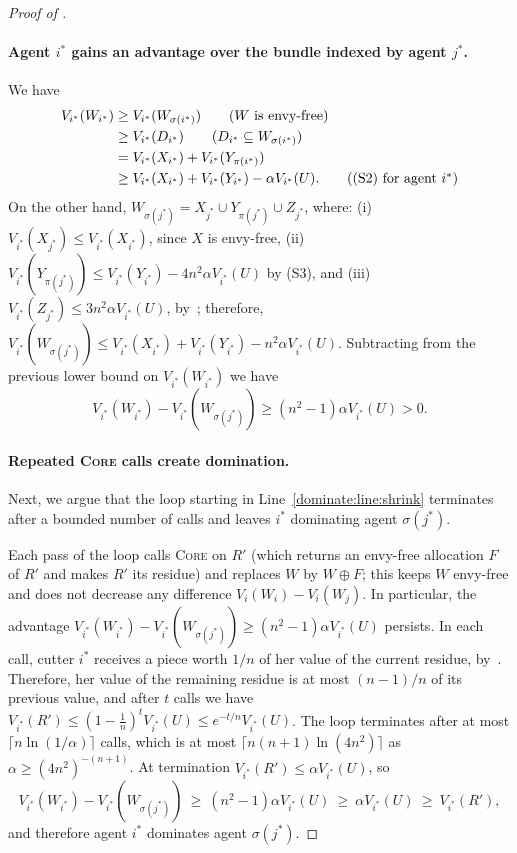 \documentclass[11pt]{article}
\newcommand{\Core}{\textsc{Core}}
\theoremstyle{plain}
\theoremstyle{definition}
\theoremstyle{plain}
\begin{document}
\begin{proof}[Proof of ]
\paragraph{Agent $i^*$ gains an advantage over the bundle indexed by agent $j^*$.}
We have
\begin{align*}
  V_{i^*}(W_{i^*}) &\ge V_{i^*}(W_{\sigma(i^*)}) \tag{$W$ is envy-free} \\ 
  &\ge V_{i^*}(D_{i^*}) \tag{$D_{i^*}\subseteq W_{\sigma(i^*)}$} \\ 
  &= V_{i^*}(X_{i^*})+V_{i^*}(Y_{\pi(i^*)}) \\ 
  &\ge V_{i^*}(X_{i^*})+V_{i^*}(Y_{i^*})-\alpha V_{i^*}(U). \tag{(S2) for agent $i^*$}  
\end{align*}
On the other hand, $W_{\sigma(j^*)}=X_{j^*}\cup Y_{\pi(j^*)}\cup Z_{j^*}$, where: (i) $V_{i^*}(X_{j^*})\le V_{i^*}(X_{i^*})$, since $X$ is envy-free, (ii) $V_{i^*}(Y_{\pi(j^*)})\le V_{i^*}(Y_{i^*})-4n^2\alpha V_{i^*}(U)$ by (S3), and (iii) $V_{i^*}(Z_{j^*})\le 3n^2\alpha V_{i^*}(U)$, by~; therefore, $V_{i^*}(W_{\sigma(j^*)}) \le V_{i^*}(X_{i^*})+V_{i^*}(Y_{i^*}) - n^2\alpha V_{i^*}(U)$. Subtracting from the previous lower bound on $V_{i^*}(W_{i^*})$ we have
\[
V_{i^*}(W_{i^*})-V_{i^*}(W_{\sigma(j^*)})\ge (n^2-1)\alpha V_{i^*}(U)>0.
\]

\paragraph{Repeated \Core{} calls create domination.}
Next, we argue that the loop starting in Line~\ref{dominate:line:shrink} terminates after a bounded number of calls and leaves $i^*$ dominating agent $\sigma(j^*)$.

Each pass of the loop calls \Core{} on $R'$ (which returns an envy-free allocation $F$ of $R'$ and makes $R'$ its residue) and replaces $W$ by $W\oplus F$; this keeps $W$ envy-free and does not decrease any difference $V_i(W_i)-V_i(W_j)$. In particular, the advantage $V_{i^*}(W_{i^*})-V_{i^*}(W_{\sigma(j^*)})\ge (n^2-1)\alpha V_{i^*}(U)$ persists.
In each call, cutter $i^*$ receives a piece worth $1/n$ of her value of the current residue, by~. Therefore, her value of the remaining residue is at most $(n-1)/n$ of its previous value, and after $t$ calls we have $V_{i^*}(R')\le(1-\frac1n)^tV_{i^*}(U)\le e^{-t/n}V_{i^*}(U)$. The loop terminates after at most $\lceil n\ln(1/\alpha)\rceil$ calls, which is at most $\lceil n(n+1)\ln(4n^2)\rceil$ as $\alpha\ge(4n^2)^{-(n+1)}$. At termination $V_{i^*}(R')\le\alpha V_{i^*}(U)$, so
\begin{equation}\label{eq: i dominates sigma j}
 V_{i^*}(W_{i^*})-V_{i^*}(W_{\sigma(j^*)})\ \ge\ (n^2-1)\alpha V_{i^*}(U)\ \ge\ \alpha V_{i^*}(U)\ \ge\ V_{i^*}(R'),   
\end{equation}
and therefore agent $i^*$ dominates agent $\sigma(j^*)$. 


\end{proof}
\end{document}
